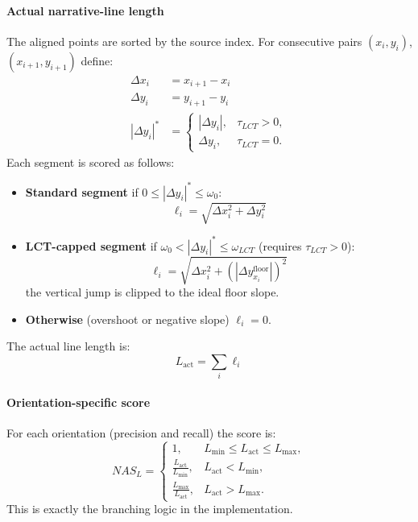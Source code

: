 \documentclass[main.tex]{subfiles}
\begin{document}
\paragraph{Actual narrative-line length}
The aligned points are sorted by the source index. For consecutive pairs $(x_i, y_i)$, $(x_{i+1}, y_{i+1})$ define:
\begin{align}
\Delta x_i &= x_{i+1} - x_i \\
\Delta y_i &= y_{i+1} - y_i \\
|\Delta y_i|^* &= \begin{cases}
|\Delta y_i|, & \tau_{LCT} > 0, \\
\Delta y_i, & \tau_{LCT} = 0.
\end{cases}
\end{align}
Each segment is scored as follows:
\begin{itemize}
\item \textbf{Standard segment} if $0 \leq |\Delta y_i|^* \leq \omega_0$:
\begin{equation}
\ell_i = \sqrt{\Delta x_i^2 + \Delta y_i^2}
\end{equation}
\item \textbf{LCT-capped segment} if $\omega_0 < |\Delta y_i|^* \leq \omega_{LCT}$ (requires $\tau_{LCT} > 0$):
\begin{equation}
\ell_i = \sqrt{\Delta x_i^2 + (|\Delta y_{x_i}^{\text{floor}}|)^2}
\end{equation}
the vertical jump is clipped to the ideal floor slope.
\item \textbf{Otherwise} (overshoot or negative slope) $\ell_i = 0$.
\end{itemize}
The actual line length is:
\begin{equation}
L_{\text{act}} = \sum_i \ell_i
\end{equation}

\paragraph{Orientation-specific score}
For each orientation (precision and recall) the score is:
\begin{equation}
NAS_L = \begin{cases}
1, & L_{\min} \leq L_{\text{act}} \leq L_{\max}, \\
\frac{L_{\text{act}}}{L_{\min}}, & L_{\text{act}} < L_{\min}, \\
\frac{L_{\max}}{L_{\text{act}}}, & L_{\text{act}} > L_{\max}.
\end{cases}
\end{equation}
This is exactly the branching logic in the implementation.
\end{document}
